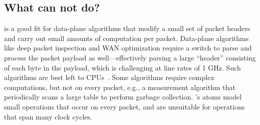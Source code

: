 \subsection{What can \absmachine not do?}
\label{ss:limitations}

\absmachine is a good fit for data-plane algorithms that modify a small set of
packet headers and carry out small amounts of computation
per packet. Data-plane algorithms like deep packet inspection and WAN
optimization require a switch to parse and process the packet payload as
well---effectively parsing a large ``header'' consisting of each byte in the
payload, which is challenging at line rates of 1 GHz. Such algorithms are best
left to CPUs~\cite{e2}.  Some algorithms require complex computations, but not
on every packet, e.g., a measurement algorithm that periodically scans a large
table to perform garbage collection.  \absmachine's atoms model small
operations that occur on every packet, and are unsuitable for operations
that span many clock cycles.
